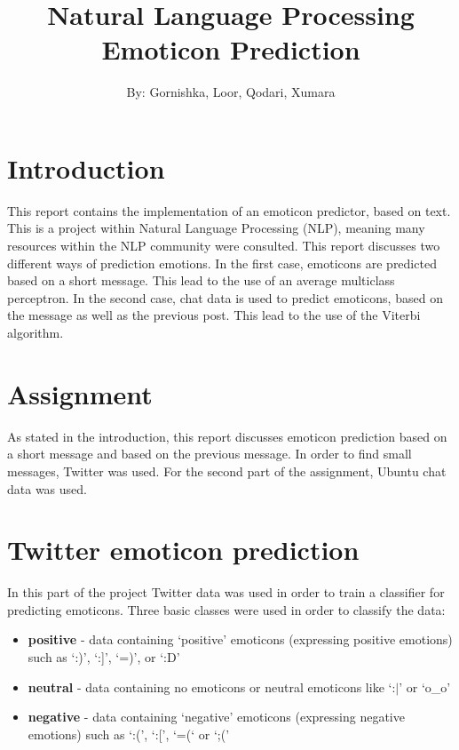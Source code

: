 \documentclass{article}
\begin{document}
\title{Natural Language Processing \\ Emoticon Prediction}

\author{By: Gornishka, Loor, Qodari, Xumara}
\maketitle


\tableofcontents

\pagebreak


\section{Introduction}

This report contains the implementation of an emoticon predictor, based on text. This is a project within Natural Language Processing (NLP), meaning many resources within the NLP community were consulted. This report discusses two different ways of prediction emotions. In the first case, emoticons are predicted based on a short message. This lead to the use of an average multiclass perceptron. In the second case, chat data is used to predict emoticons, based on the message as well as the previous post. This lead to the use of the Viterbi algorithm.


\section{Assignment}

As stated in the introduction, this report discusses emoticon prediction based on a short message and based on the previous message. In order to find small messages, Twitter was used. For the second part of the assignment, Ubuntu chat data was used.

\pagebreak


\section{Twitter emoticon prediction}

In this part of the project Twitter data was used in order to train a classifier for predicting emoticons. Three basic classes were used in order to classify the data:

\begin{itemize}
\item \textbf{positive} - data containing `positive' emoticons (expressing positive emotions) such as `:)', `:]', `=)', or `:D'
\item \textbf{neutral} - data containing no emoticons or neutral emoticons like `:$\vert$' or `o\_o'
\item \textbf{negative} - data containing `negative' emoticons (expressing negative emotions) such as `:(', `:[', `=(` or `;(' 
\end{itemize}
\end{document}
